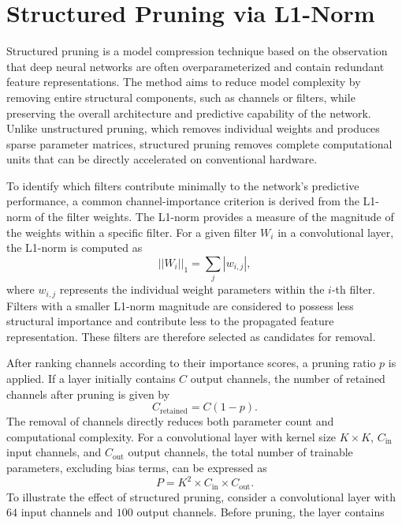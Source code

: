 \section{Structured Pruning via L1-Norm}
\label{sec:pruning}
Structured pruning is a model compression technique based on the observation that deep neural networks are often overparameterized and contain redundant feature representations. The method aims to reduce model complexity by removing entire structural components, such as channels or filters, while preserving the overall architecture and predictive capability of the network. Unlike unstructured pruning, which removes individual weights and produces sparse parameter matrices, structured pruning removes complete computational units that can be directly accelerated on conventional hardware.

To identify which filters contribute minimally to the network's predictive performance, a common channel-importance criterion is derived from the L1-norm of the filter weights. The L1-norm provides a measure of the magnitude of the weights within a specific filter. For a given filter $W_i$ in a convolutional layer, the L1-norm is computed as
\begin{equation}
||W_i||_1 = \sum_{j} |w_{i,j}|,
\end{equation}
where $w_{i,j}$ represents the individual weight parameters within the $i$-th filter. Filters with a smaller L1-norm magnitude are considered to possess less structural importance and contribute less to the propagated feature representation. These filters are therefore selected as candidates for removal.

After ranking channels according to their importance scores, a pruning ratio $p$ is applied. If a layer initially contains $C$ output channels, the number of retained channels after pruning is given by
\begin{equation}
C_{\mathrm{retained}} = C(1-p).
\end{equation}
The removal of channels directly reduces both parameter count and computational complexity. For a convolutional layer with kernel size $K \times K$, $C_{\mathrm{in}}$ input channels, and $C_{\mathrm{out}}$ output channels, the total number of trainable parameters, excluding bias terms, can be expressed as
\begin{equation}
P = K^{2} \times C_{\mathrm{in}} \times C_{\mathrm{out}}.
\end{equation}
To illustrate the effect of structured pruning, consider a convolutional layer with $64$ input channels and $100$ output channels. Before pruning, the layer contains

